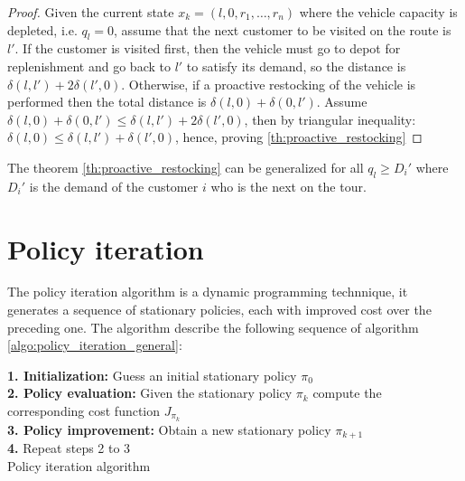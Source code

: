 \begin{proof}
Given the current state $x_k=(l,0,r_1,\ldots, r_n)$ where the vehicle capacity is depleted, i.e. $q_l = 0$, assume that the next customer to be visited on the route is $l'$. If the customer is visited first, then the vehicle must go to depot for replenishment and go back to $l'$ to satisfy its demand, so the distance is $\delta(l,l')+2\delta(l',0)$. Otherwise, if a proactive restocking of the vehicle is performed then the total distance is $\delta(l,0)+\delta(0,l')$.
Assume $\delta(l,0)+\delta(0,l') \leq \delta(l,l')+2\delta(l',0)$, then by triangular inequality: $\delta(l,0) \leq \delta(l,l')+\delta(l',0)$, hence, proving \ref{th:proactive_restocking}
\end{proof}

\begin{lemma}%
 The theorem \ref{th:proactive_restocking} can be generalized for all $q_l \geq D_i'$ where $D_i'$ is the demand of the customer $i$ who is the next on the tour.
\end{lemma}







\section{Policy iteration}

The policy iteration algorithm is a dynamic programming technnique, it generates a sequence of stationary policies, each with improved cost over the preceding one. The algorithm describe the following sequence of algorithm \ref{algo:policy_iteration_general}:

\begin{algorithm}
 \textbf{1. Initialization:} Guess an initial stationary policy $\pi_0$\\
 \textbf{2. Policy evaluation:} Given the stationary policy $\pi_k$ compute the corresponding cost function $J_{\pi_k}$\\
 \textbf{3. Policy improvement:} Obtain a new stationary policy $\pi_{k+1}$\\
 \textbf{4.} Repeat steps 2 to 3\\
 \caption{Policy iteration algorithm}\label{algo:policy_iteration_general}
\end{algorithm}

